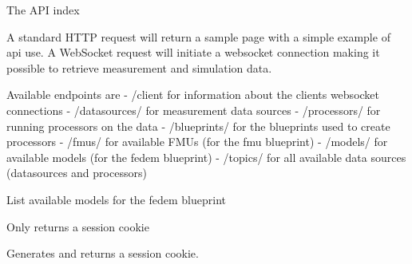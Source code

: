 \documentclass[letterpaper,10pt,english]{sphinxmanual}
\begin{document}

\begin{fulllineitems}
\label{\detokenize{src:src.views.index}}
The API index

A standard HTTP request will return a sample page with a simple example of api use.
A WebSocket request will initiate a websocket connection making it possible to retrieve measurement and simulation data.

Available endpoints are
- /client for information about the clients websocket connections
- /datasources/ for measurement data sources
- /processors/ for running processors on the data
- /blueprints/ for the blueprints used to create processors
- /fmus/ for available FMUs (for the fmu blueprint)
- /models/ for available models (for the fedem blueprint)
- /topics/ for all available data sources (datasources and processors)

\end{fulllineitems}


\begin{fulllineitems}
\label{\detokenize{src:src.views.models}}
List available models for the fedem blueprint

\end{fulllineitems}


\begin{fulllineitems}
\label{\detokenize{src:src.views.session_endpoint}}
Only returns a session cookie

Generates and returns a session cookie.

\end{fulllineitems}
\end{document}
